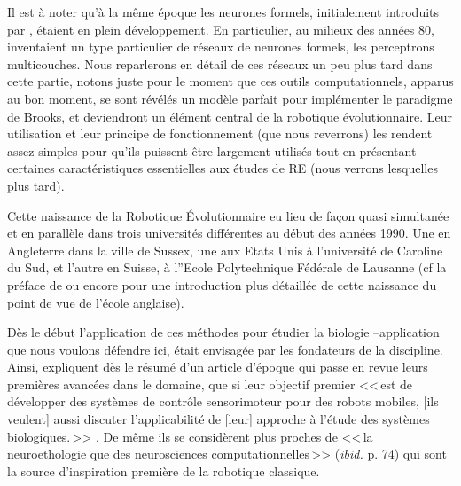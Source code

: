 Il est à noter qu'à la même époque les neurones formels, initialement introduits par \cite{mcculloch1943alogicalcideaimmanervacti}, étaient en plein développement. En particulier, au milieux des années 80, \cite{rumelhart1986learninginternalrepresentationsbyerrorpropagation} inventaient un type particulier de réseaux de neurones formels, les perceptrons multicouches. Nous reparlerons en détail de ces réseaux un peu plus tard dans cette partie, notons juste pour le moment que ces outils computationnels, apparus au bon moment, se sont révélés un modèle parfait pour implémenter le paradigme de Brooks, et deviendront un élément central de la robotique évolutionnaire. Leur utilisation et leur principe de fonctionnement (que nous reverrons) les rendent assez simples pour qu'ils puissent être largement utilisés tout en présentant certaines caractéristiques essentielles aux études de RE (nous verrons lesquelles plus tard).

Cette naissance de la Robotique \'Evolutionnaire eu lieu de façon quasi simultanée et en parallèle dans trois universités différentes au début des années 1990. Une en Angleterre dans la ville de Sussex, une aux Etats Unis à l'université de Caroline du Sud, et l'autre en Suisse, à l''Ecole Polytechnique Fédérale de Lausanne (cf la préface de \cite{nolfi00evolrobobiolintetechselfmach} ou encore \citet{harvey97evolutionaryroboticssussexapproach} pour une introduction plus détaillée de cette naissance du point de vue de l'école anglaise).

Dès le début l'application de ces méthodes pour étudier la biologie --application que nous voulons défendre ici, était envisagée par les fondateurs de la discipline. Ainsi, \cite{cliff93explorationsinevolutionaryrobotics} expliquent dès le résumé d'un article d'époque qui passe en revue leurs premières avancées dans le domaine, que si leur objectif premier <<\,est de développer des systèmes de contrôle sensorimoteur pour des robots mobiles, [ils veulent] aussi discuter l'applicabilité de [leur] approche à l'étude des systèmes biologiques.\,>> \citep[p. 73]{cliff93explorationsinevolutionaryrobotics}. De même ils se considèrent plus proches de <<\,la neuroethologie que des neurosciences computationnelles\,>> (\emph{ibid.} p. 74) qui sont la source d'inspiration première de la robotique classique.

